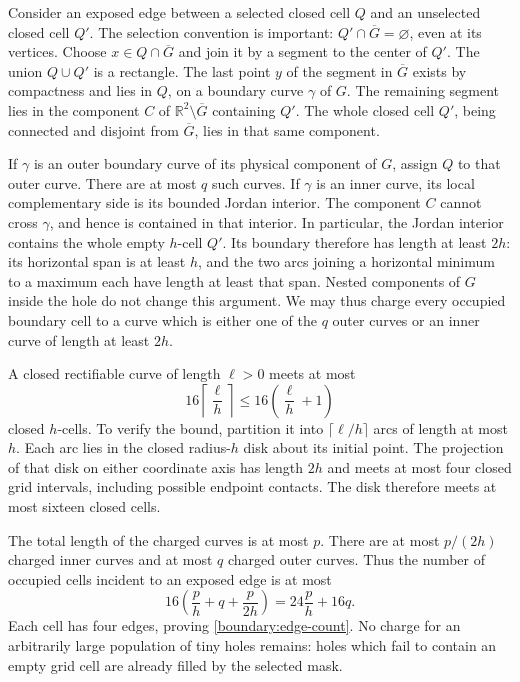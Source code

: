 \documentclass[11pt,reqno]{amsart}
\numberwithin{equation}{section}
\newcommand{\R}{\mathbb R}
\begin{document}
Consider an exposed edge between a selected closed cell \(Q\) and
an unselected closed cell \(Q'\).  The selection convention is
important: \(Q'\cap\overline G=\varnothing\), even at its vertices.
Choose \(x\in Q\cap\overline G\) and join it by a segment to the
center of \(Q'\).  The union \(Q\cup Q'\) is a rectangle.  The last
point \(y\) of the segment in \(\overline G\) exists by compactness
and lies in \(Q\), on a boundary curve \(\gamma\) of \(G\).  The
remaining segment lies in the component \(C\) of
\(\R^2\setminus\overline G\) containing \(Q'\).  The whole closed
cell \(Q'\), being connected and disjoint from \(\overline G\),
lies in that same component.

If \(\gamma\) is an outer boundary curve of its physical component
of \(G\), assign \(Q\) to that outer curve.  There are at most \(q\)
such curves.  If \(\gamma\) is an inner curve, its local
complementary side is its bounded Jordan interior.  The component
\(C\) cannot cross \(\gamma\), and hence is contained in that
interior.  In particular, the Jordan interior contains the whole
empty \(h\)-cell \(Q'\).  Its boundary therefore has length at
least \(2h\): its horizontal span is at least \(h\), and the two
arcs joining a horizontal minimum to a maximum each have length
at least that span.  Nested components of \(G\) inside the hole
do not change this argument.  We may thus charge every occupied
boundary cell to a curve which is either one of the \(q\) outer
curves or an inner curve of length at least \(2h\).

A closed rectifiable curve of length \(\ell>0\) meets at most
\[
 16\left\lceil\frac{\ell}{h}\right\rceil
 \le16\left(\frac{\ell}{h}+1\right)
\]
closed \(h\)-cells.  To verify the bound, partition it into
\(\lceil\ell/h\rceil\) arcs of length at most \(h\).
Each arc lies in the closed radius-\(h\) disk about its initial
point.  The projection of that disk on either coordinate axis has
length \(2h\) and meets at most four closed grid intervals,
including possible endpoint contacts.  The disk therefore meets
at most sixteen closed cells.

The total length of the charged curves is at most \(p\).
There are at most \(p/(2h)\) charged inner curves and at most \(q\)
charged outer curves.  Thus the number of occupied cells incident
to an exposed edge is at most
\[
 16\left(\frac ph+q+\frac{p}{2h}\right)
 =24\frac ph+16q.
\]
Each cell has four edges, proving \eqref{boundary:edge-count}.
No charge for an arbitrarily large population of tiny holes
remains: holes which fail to contain an empty grid cell are already
filled by the selected mask.
\end{document}
